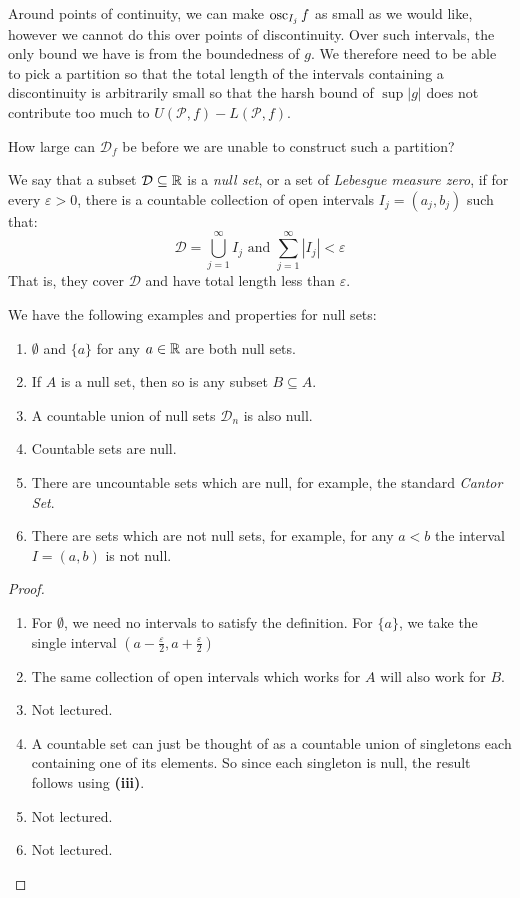 \documentclass[../main.tex]{subfiles}
\begin{document}
Around points of continuity, we can make $\operatorname*{osc}_{I_j} f$ as small as we would like, however we cannot do this over points of discontinuity.
Over such intervals, the only bound we have is from the boundedness of $g$.
We therefore need to be able to pick a partition so that the total length of the intervals containing a discontinuity is arbitrarily small so that the harsh bound of $\sup |g|$ does not contribute too much to $U(\mathcal{P}, f) - L(\mathcal{P}, f)$.

How large can $\mathcal{D}_f$ be before we are unable to construct such a partition?
\begin{definition}
  We say that a subset $\mathcal{D} \subseteq \mathbb{R}$ is a \textit{null set}, or a set of \textit{Lebesgue measure zero}, if for every $\varepsilon > 0$, there is a countable collection of open intervals $I_j = (a_j, b_j)$ such that:
  \[
    \mathcal{D} = \bigcup_{j = 1}^{\infty} I_j \text{ and } \sum_{j = 1}^{\infty} |I_j| < \varepsilon
  \]
  That is, they cover $\mathcal{D}$ and have total length less than $\varepsilon$.
\end{definition}
\begin{proposition}
  We have the following examples and properties for null sets:
  \begin{enumerate}
    \item $\emptyset$ and $\{a\}$ for any $a \in \mathbb{R}$ are both null sets.
    \item If $A$ is a null set, then so is any subset $B \subseteq A$.
    \item A countable union of null sets $\mathcal{D}_n$ is also null.
    \item Countable sets are null.
    \item There are uncountable sets which are null, for example, the standard \textit{Cantor Set}.
    \item There are sets which are not null sets, for example, for any $a < b$ the interval $I = (a, b)$ is not null.
  \end{enumerate}
\end{proposition}
\begin{proof}
  \begin{enumerate}
    \item For $\emptyset$, we need no intervals to satisfy the definition.
      For $\{a\}$, we take the single interval $(a - \frac{\varepsilon}{2}, a + \frac{\varepsilon}{2})$
    \item The same collection of open intervals which works for $A$ will also work for $B$.
    \item Not lectured.
    \item A countable set can just be thought of as a countable union of singletons each containing one of its elements.
      So since each singleton is null, the result follows using \textbf{(iii)}.
    \item Not lectured.
    \item Not lectured.
  \end{enumerate}
\end{proof}
\end{document}
